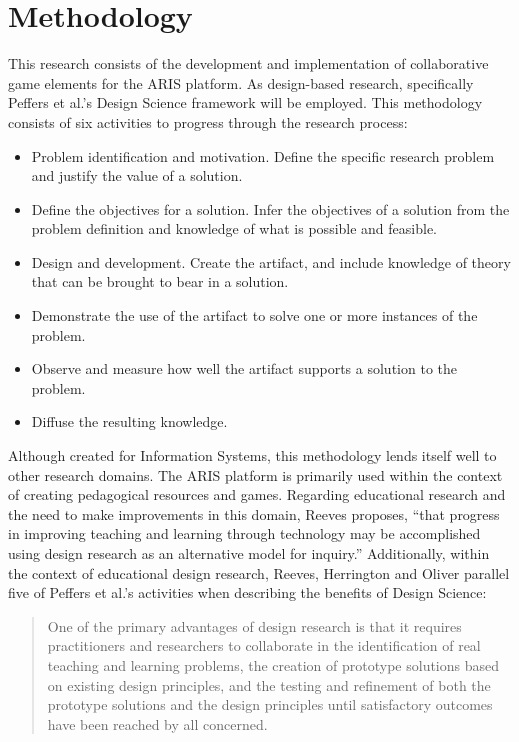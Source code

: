 \documentclass{sigchi}
\begin{document}
\section{Methodology}
This research consists of the development and implementation of collaborative game elements for the ARIS platform. As design-based research, specifically Peffers et al.’s Design Science framework will be employed. This methodology consists of six activities to progress through the research process:

\begin{itemize}
  \item Problem identification and motivation. Define the specific research problem and justify the value of a solution.
  \item Define the objectives for a solution. Infer the objectives of a solution from the problem definition and knowledge of what is possible and feasible.
  \item Design and development. Create the artifact, and include knowledge of theory that can be brought to bear in a solution.
  \item Demonstrate the use of the artifact to solve one or more instances of the problem.
  \item Observe and measure how well the artifact supports a solution to the problem.
  \item Diffuse the resulting knowledge. \cite{peffers2007design}
\end{itemize}

Although created for Information Systems, this methodology lends itself well to other research domains. The ARIS platform is primarily used within the context of creating pedagogical resources and games. Regarding educational research and the need to make improvements in this domain, Reeves proposes, ``that progress in improving teaching and learning through technology may be accomplished using design research as an alternative model for inquiry.''\cite{reeves2006design} Additionally, within the context of educational design research, Reeves, Herrington and Oliver parallel five of Peffers et al.’s activities when describing the benefits of Design Science:

\blockquote{One of the primary advantages of design research is that it requires practitioners and researchers to collaborate in the identification of real teaching and learning problems, the creation of prototype solutions based on existing design principles, and the testing and refinement of both the prototype solutions and the design principles until satisfactory outcomes have been reached by all concerned.\cite{reeves2005design}}
\end{document}
